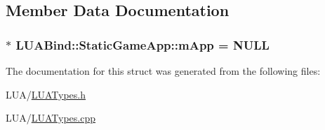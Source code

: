 \subsection{Member Data Documentation}
\subsubsection[{\texorpdfstring{m\+App}{mApp}}]{ $\ast$ L\+U\+A\+Bind\+::\+Static\+Game\+App\+::m\+App = N\+U\+LL\hspace{0.3cm}{\ttfamily [static]}}\hypertarget{structLUABind_1_1StaticGameApp_a4cd307a6ce2d34f235389436cfddee73}{}\label{structLUABind_1_1StaticGameApp_a4cd307a6ce2d34f235389436cfddee73}


The documentation for this struct was generated from the following files\+:\begin{DoxyCompactItemize}
\item 
L\+U\+A/\hyperlink{LUATypes_8h}{L\+U\+A\+Types.\+h}\item 
L\+U\+A/\hyperlink{LUATypes_8cpp}{L\+U\+A\+Types.\+cpp}\end{DoxyCompactItemize}
